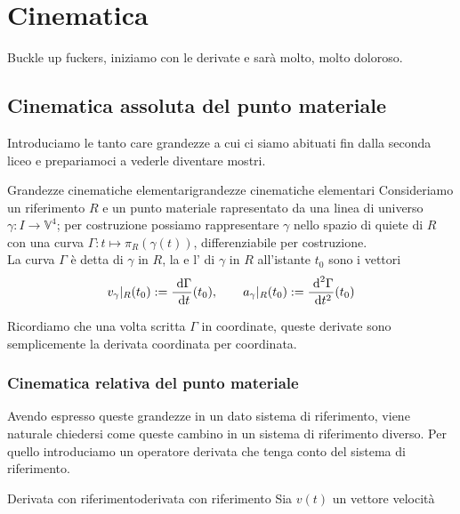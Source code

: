 \documentclass[annatarbolditalic, openany]{book}
\renewcommand\V{\mathbb{V}}
\begin{document}
\chapter{Cinematica}

Buckle up fuckers, iniziamo con le derivate e sarà molto, molto doloroso.

\section{Cinematica assoluta del punto materiale}

Introduciamo le tanto care grandezze a cui ci siamo abituati fin dalla seconda liceo e prepariamoci a vederle diventare mostri.

\begin{definition}{Grandezze cinematiche elementari}{grandezze cinematiche elementari}
    Consideriamo un riferimento $R$ e un punto materiale rapresentato da una linea di universo $\gamma : I \to \V^4$; per costruzione possiamo rappresentare $\gamma$ nello spazio di quiete di $R$ con una curva $\Gamma : t \mapsto \pi_R(\gamma(t))$, differenziabile per costruzione.\\
    La curva $\Gamma$ è detta  di $\gamma$ in $R$, la  e l' di $\gamma$ in $R$ all'istante $t_0$ sono i vettori
    \[ v_\gamma|_R (t_0) := \frac{\text{ d} \Gamma}{\text{ d} t}(t_0), \qquad a_\gamma|_R(t_0) := \frac{\text{ d}^2 \Gamma}{\text{ d} t^2}(t_0) \]
\end{definition}


Ricordiamo che una volta scritta $\Gamma$ in coordinate, queste derivate sono semplicemente la derivata coordinata per coordinata.

\subsection{Cinematica relativa del punto materiale}

Avendo espresso queste grandezze in un dato sistema di riferimento, viene naturale chiedersi come queste cambino in un sistema di riferimento diverso. Per quello introduciamo un operatore derivata che tenga conto del sistema di riferimento.

\begin{definition}{Derivata con riferimento}{derivata con riferimento}
    Sia $v(t)$ un vettore velocità
\end{definition}

\printbibliography
\end{document}
